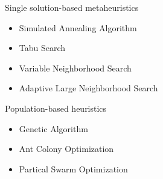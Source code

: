     \begin{frame}{Single solution-based metaheuristics}
      \Large
      \begin{spacing}{2}
        \begin{itemize}
          \item Simulated Annealing Algorithm
          \item Tabu Search
          \item Variable Neighborhood Search
          \item Adaptive Large Neighborhood Search
        \end{itemize}
      \end{spacing}
    \end{frame}

    \begin{frame}{Population-based heuristics}
      \Large
      \begin{spacing}{2}
        \begin{itemize}
          \item Genetic Algorithm
          \item Ant Colony Optimization
          \item Partical Swarm Optimization
        \end{itemize}
      \end{spacing}

    \end{frame}


